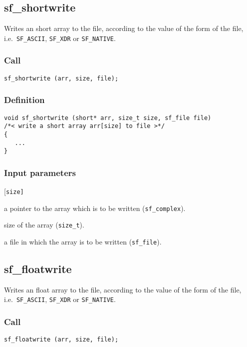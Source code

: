 \subsection{{sf\_shortwrite}}
Writes an short array to the file, according to the value of the form of the file, i.e.~\texttt{SF\_ASCII}, \texttt{SF\_XDR} or \texttt{SF\_NATIVE}.

\subsubsection*{Call}
\begin{verbatim}sf_shortwrite (arr, size, file);\end{verbatim}

\subsubsection*{Definition}
\begin{verbatim}
void sf_shortwrite (short* arr, size_t size, sf_file file)
/*< write a short array arr[size] to file >*/
{
   ...
}
\end{verbatim}

\subsubsection*{Input parameters}
\begin{desclist}{\tt }{\quad}[\tt size]
   \setlength\itemsep{0pt}
   \item[arr]  a pointer to the array which is to be written (\texttt{sf\_complex}). 
   \item[size] size of the array (\texttt{size\_t}). 
   \item[file] a file in which the array is to be written (\texttt{sf\_file}).
\end{desclist}




\subsection{{sf\_floatwrite}}\label{sec:sf_floatwrite}
Writes an float array to the file, according to the value of the form of the file, i.e.~\texttt{SF\_ASCII}, \texttt{SF\_XDR} or \texttt{SF\_NATIVE}.

\subsubsection*{Call}
\begin{verbatim}sf_floatwrite (arr, size, file);\end{verbatim}

